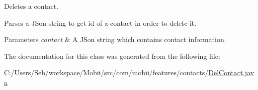 Deletes a contact. 

Parses a J\-Son string to get id of a contact in order to delete it. 
\begin{DoxyParams}{Parameters}
{\em contact} & A J\-Son string which contains contact information. \\
\hline
\end{DoxyParams}


The documentation for this class was generated from the following file\-:\begin{DoxyCompactItemize}
\item 
C\-:/\-Users/\-Seb/workspace/\-Mobii/src/com/mobii/features/contacts/\hyperlink{_del_contact_8java}{Del\-Contact.\-java}\end{DoxyCompactItemize}
